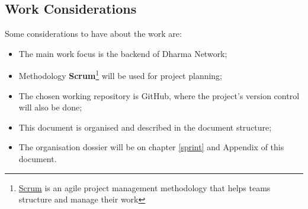 \subsection{Work Considerations}

Some considerations to have about the work are:

\begin{itemize} 

	\item The main work focus is the backend of Dharma Network;
	\item Methodology \textbf{Scrum}\footnote{\href{https://www.atlassian.com/agile/scrum}{Scrum} is an agile project management methodology that helps teams structure and manage their work} will be used for project planning;
	\item The chosen working repository is GitHub, where the project's version control will also be done;
	\item This document is organised and described in the document structure;
	\item The organisation dossier will be on chapter \ref{sprint} and Appendix of this document.
\end{itemize}